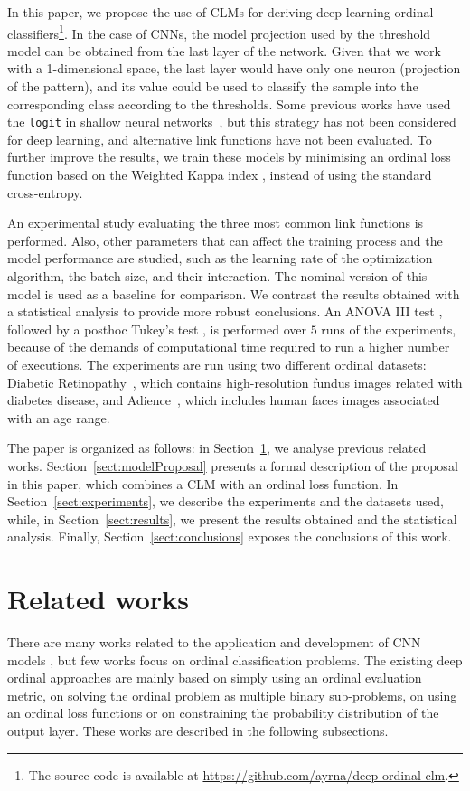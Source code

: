\documentclass[preprint]{elsarticle}
\begin{document}
In this paper, we propose the use of CLMs for deriving deep learning ordinal classifiers\footnote{The source code is available at \url{https://github.com/ayrna/deep-ordinal-clm}.}. In the case of CNNs, the model projection used by the threshold model can be obtained from the last layer of the network. Given that we work with a 1-dimensional space, the last layer would have only one neuron (projection of the pattern), and its value could be used to classify the sample into the corresponding class according to the thresholds. Some previous works have used the \texttt{logit} in shallow neural networks~\cite{gutierrez2016ordinal}, but this strategy has not been considered for deep learning, and alternative link functions have not been evaluated. To further improve the results, we train these models by minimising an ordinal loss function based on the Weighted Kappa index \cite{de2018weighted}, instead of using the standard cross-entropy.

An experimental study evaluating the three most common link functions is performed. Also, other parameters that can affect the training process and the model performance are studied, such as the learning rate of the optimization algorithm, the batch size, and their interaction. The nominal version of this model is used as a baseline for comparison. We contrast the results obtained with a statistical analysis to provide more robust conclusions. An ANOVA III test \cite{miller1997beyond}, followed by a posthoc Tukey's test \cite{tukey1949comparing}, is performed over $5$ runs of the experiments, because of the demands of computational time required to run a higher number of executions. The experiments are run using two different ordinal datasets: Diabetic Retinopathy~\cite{de2018weighted}, which contains high-resolution fundus images related with diabetes disease, and Adience~\cite{beckham2017unimodal}, which includes human faces images associated with an age range.

The paper is organized as follows: in Section~\ref{sect:relatedwork}, we analyse previous related works. Section~\ref{sect:modelProposal} presents a formal description of the proposal in this paper, which combines a CLM with an ordinal loss function. In Section~\ref{sect:experiments}, we describe the experiments and the datasets used, while, in Section~\ref{sect:results}, we present the results obtained and the statistical analysis. Finally, Section~\ref{sect:conclusions} exposes the conclusions of this work.

\section{Related works}
\label{sect:relatedwork}
There are many works related to the application and development of CNN models \cite{liu2017deep}, but few works focus on ordinal classification problems. The existing deep ordinal approaches are mainly based on simply using an ordinal evaluation metric, on solving the ordinal problem as multiple binary sub-problems, on using an ordinal loss functions or on constraining the probability distribution of the output layer. These works are described in the following subsections.
\end{document}
